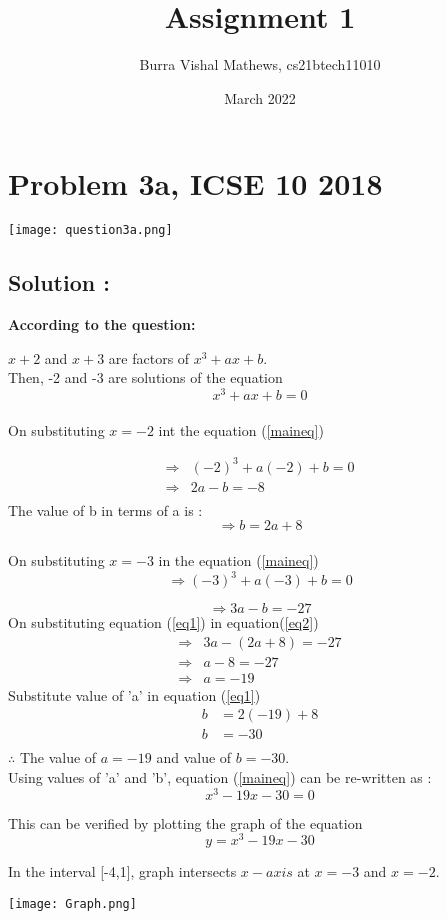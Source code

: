 \documentclass[12t, a4paper]{article}
\title{\textbf{Assignment 1}}
\author{Burra Vishal Mathews, cs21btech11010}
\date{March 2022}
\begin{document}
\maketitle

\section*{Problem 3a, ICSE 10 2018}
\texttt{[image: question3a.png]}
\begin{multicols*}{2}
\section*{Solution :}
    \textbf{According to the question:}

    $x+2$ and $x+3$ are factors of $x^3+ax+b$.\\
    Then, -2 and -3 are solutions of the equation 
    \begin{equation}
    \label{maineq}
        x^3+ax+b=0
    \end{equation}
    \\
    On substituting $x=-2$  int the equation (\ref{maineq})

    \begin{align*}
        \Rightarrow & (-2)^3+a(-2)+b=0\\ 
        \Rightarrow & 2a-b=-8\\
    \end{align*}
    The value of b in terms of a is :
    \begin{equation}
    \label{eq1}
        \Rightarrow b=2a+8
    \end{equation}
    \\
    On substituting $x=-3$ in the equation (\ref{maineq})
        \[\Rightarrow (-3)^3+a(-3)+b=0\]


    \begin{equation}
    \label{eq2}
       \Rightarrow 3a-b=-27
    \end{equation}
    On substituting equation (\ref{eq1}) in equation(\ref{eq2})
    \begin{align*}
        \Rightarrow & 3a-(2a+8)=-27\\
        \Rightarrow & a-8=-27\\
        \Rightarrow & a=-19
    \end{align*}
    Substitute value of 'a' in equation (\ref{eq1}) 
    \begin{align*}
    b&=2(-19)+8\\
    b&=-30\\
    \end{align*}
    $ \therefore $ The value of $a = -19$ and value of $b =   -30$.\\
    Using values of 'a' and 'b', equation (\ref{maineq}) can be re-written as :
    \begin{equation}
    \label{Peq}
        x^3-19x-30=0
    \end{equation}

    This can be verified by plotting the graph of the equation
    $$y=x^3-19x-30$$

    In the interval [-4,1], graph intersects $x-axis$ at $x=-3$ and $x=-2$.
\end{multicols*}
\texttt{[image: Graph.png]}
\label{graph}
\end{document}
